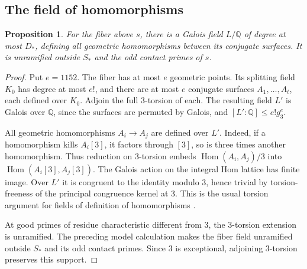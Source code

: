 \documentclass[11pt]{article}
\newtheorem{proposition}[theorem]{Proposition}
\theoremstyle{definition}
\newcommand{\Q}{\mathbb Q}\newcommand{\Z}{\mathbb Z}
\begin{document}
\subsection{The field of homomorphisms}
\begin{proposition}\label{prop:smaller-degree}
For the fiber above \(s\), there is a Galois field \(L/\Q\)
of degree at most \(D_*\), defining all geometric homomorphisms
between its conjugate surfaces. It is unramified outside
\(S_*\) and the odd contact primes of \(s\).
\end{proposition}
\begin{proof}
Put \(e=1152\). The fiber has at most \(e\) geometric points. Its splitting field
\(K_0\) has degree at most \(e!\), and there are at most \(e\)
conjugate surfaces \(A_1,\ldots,A_t\), each defined over \(K_0\).
Adjoin the full 3-torsion of each. The resulting field \(L'\) is
Galois over \(\Q\), since the surfaces are permuted by Galois,
and \([L':\Q]\le e!g_3^e\).

All geometric homomorphisms \(A_i\to A_j\) are defined over
\(L'\). Indeed, if a homomorphism kills \(A_i[3]\), it factors
through \([3]\), so is three times another homomorphism. Thus
reduction on 3-torsion embeds
\(\operatorname{Hom}(A_i,A_j)/3\) into
\(\operatorname{Hom}(A_i[3],A_j[3])\). The Galois action on
the integral Hom lattice has finite image. Over \(L'\) it is
congruent to the identity modulo 3, hence trivial by torsion-freeness
of the principal congruence kernel at 3. This is the usual torsion
argument for fields of definition of homomorphisms
\cite{SilverbergHom}.

At good primes of residue characteristic different from 3, the
3-torsion extension is unramified. The preceding model calculation makes the fiber field unramified
outside \(S_*\) and its odd contact primes. Since 3 is exceptional,
adjoining 3-torsion preserves this support.
\end{proof}
\end{document}
